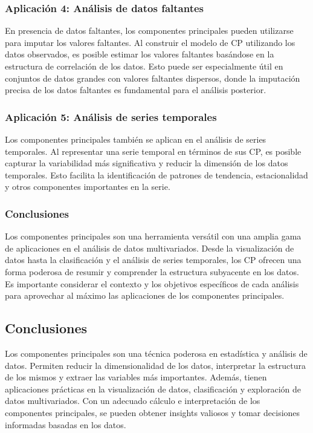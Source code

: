 \documentclass{article}
\begin{document}
\subsubsection{Aplicación 4: Análisis de datos faltantes}
En presencia de datos faltantes, los componentes principales pueden utilizarse para imputar los valores faltantes. Al construir el modelo de CP utilizando los datos observados, es posible estimar los valores faltantes basándose en la estructura de correlación de los datos. Esto puede ser especialmente útil en conjuntos de datos grandes con valores faltantes dispersos, donde la imputación precisa de los datos faltantes es fundamental para el análisis posterior.

\subsubsection{Aplicación 5: Análisis de series temporales}
Los componentes principales también se aplican en el análisis de series temporales. Al representar una serie temporal en términos de sus CP, es posible capturar la variabilidad más significativa y reducir la dimensión de los datos temporales. Esto facilita la identificación de patrones de tendencia, estacionalidad y otros componentes importantes en la serie.

\subsubsection*{Conclusiones}
Los componentes principales son una herramienta versátil con una amplia gama de aplicaciones en el análisis de datos multivariados. Desde la visualización de datos hasta la clasificación y el análisis de series temporales, los CP ofrecen una forma poderosa de resumir y comprender la estructura subyacente en los datos. Es importante considerar el contexto y los objetivos específicos de cada análisis para aprovechar al máximo las aplicaciones de los componentes principales.


\subsection*{Conclusiones}
Los componentes principales son una técnica poderosa en estadística y análisis de datos. Permiten reducir la dimensionalidad de los datos, interpretar la estructura de los mismos y extraer las variables más importantes. Además, tienen aplicaciones prácticas en la visualización de datos, clasificación y exploración de datos multivariados. Con un adecuado cálculo e interpretación de los componentes principales, se pueden obtener insights valiosos y tomar decisiones informadas basadas en los datos.
 
\end{document}
